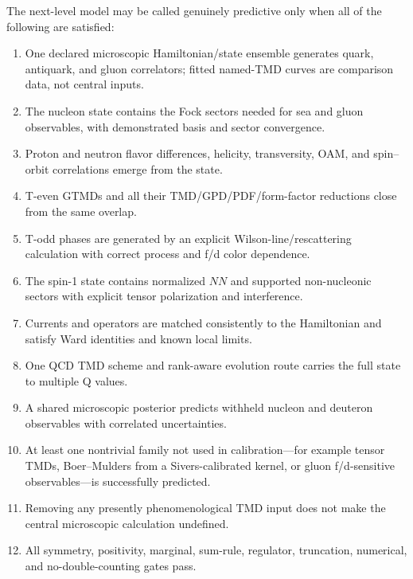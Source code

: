 \documentclass[11pt]{article}
\begin{document}
The next-level model may be called genuinely predictive only when all of the
following are satisfied:
\begin{enumerate}
  \item One declared microscopic Hamiltonian/state ensemble generates
  quark, antiquark, and gluon correlators; fitted named-TMD curves are
  comparison data, not central inputs.
  \item The nucleon state contains the Fock sectors needed for sea and gluon
  observables, with demonstrated basis and sector convergence.
  \item Proton and neutron flavor differences, helicity, transversity, OAM,
  and spin--orbit correlations emerge from the state.
  \item T-even GTMDs and all their TMD/GPD/PDF/form-factor reductions close
  from the same overlap.
  \item T-odd phases are generated by an explicit Wilson-line/rescattering
  calculation with correct process and f/d color dependence.
  \item The spin-1 state contains normalized \(NN\) and supported
  non-nucleonic sectors with explicit tensor polarization and interference.
  \item Currents and operators are matched consistently to the Hamiltonian
  and satisfy Ward identities and known local limits.
  \item One QCD TMD scheme and rank-aware evolution route carries the full
  state to multiple Q values.
  \item A shared microscopic posterior predicts withheld nucleon and
  deuteron observables with correlated uncertainties.
  \item At least one nontrivial family not used in calibration---for example
  tensor TMDs, Boer--Mulders from a Sivers-calibrated kernel, or gluon
  f/d-sensitive observables---is successfully predicted.
  \item Removing any presently phenomenological TMD input does not make the
  central microscopic calculation undefined.
  \item All symmetry, positivity, marginal, sum-rule, regulator,
  truncation, numerical, and no-double-counting gates pass.
\end{enumerate}
\end{document}
